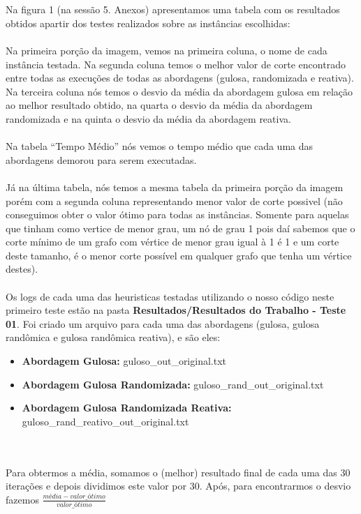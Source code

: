 \documentclass[a4paper, 12pt]{article}
\begin{document}
\\ \\ \indent Na figura 1 (na sessão 5. Anexos) apresentamos uma tabela com os resultados obtidos apartir dos testes realizados sobre as instâncias escolhidas:
\\ \\ \ident Na primeira porção da imagem, vemos na primeira coluna, o nome de cada instância testada. Na segunda coluna temos o melhor valor de corte encontrado entre todas as execuções de todas as abordagens (gulosa, randomizada e reativa). Na terceira coluna nós temos o desvio da média da abordagem gulosa em relação ao melhor resultado obtido{\tiny*}, na quarta o desvio da média da abordagem randomizada e na quinta o desvio da média da abordagem reativa{\tiny*}.
\\ \\ \indent Na tabela ``Tempo Médio'' nós vemos o tempo médio que cada uma das abordagens demorou para serem executadas.
\\ \\ \indent Já na última tabela, nós temos a mesma tabela da primeira porção da imagem porém com a segunda coluna representando menor valor de corte possivel (não conseguimos obter o valor ótimo para todas as instâncias. Somente para aquelas que tinham como vertice de menor grau, um nó de grau 1 pois daí sabemos que o corte mínimo de um grafo com vértice de menor grau igual à 1 é 1 e um corte deste tamanho, é o menor corte possível em qualquer grafo que tenha um vértice destes).
\\ \\ \indent Os logs de cada uma das heuristicas testadas utilizando o nosso código neste primeiro teste estão na pasta \textbf{Resultados/Resultados do Trabalho - Teste 01}. Foi criado um arquivo para cada uma das abordagens (gulosa, gulosa randômica e gulosa randômica reativa), e são eles:
\begin{itemize}
  \item \textbf{Abordagem Gulosa:} guloso\_out\_original.txt
  \item \textbf{Abordagem Gulosa Randomizada:} guloso\_rand\_out\_original.txt
  \item \textbf{Abordagem Gulosa Randomizada Reativa:} guloso\_rand\_reativo\_out\_original.txt
\end{itemize}
\\ \\ {\tiny * Para obtermos a média, somamos o (melhor) resultado final de cada uma das 30 iterações e depois dividimos este valor por 30. Após, para encontrarmos o desvio fazemos  \( \frac{média - valor\_ótimo}{valor\_ótimo} \)} \\ \\
\end{document}
